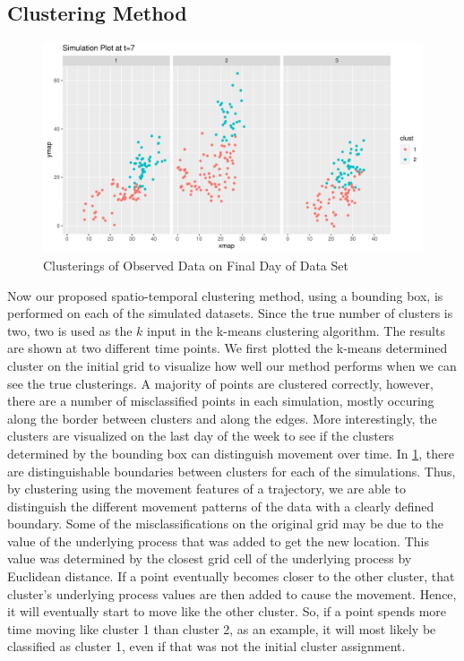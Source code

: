 \documentclass[12pt]{article}
\begin{document}
\hypertarget{clustering-method}{%
\subsection{Clustering Method}\label{clustering-method}}

\begin{figure}[tbp]

{\centering \includegraphics[width=\linewidth,]{spatio-temporal-model-arctic-sea-ice_files/figure-latex/all-clus-1} 

}

\caption{Clusterings of Observed Data on Final Day of Data Set}\label{fig:all-clus}
\end{figure}

Now our proposed spatio-temporal clustering method, using a bounding
box, is performed on each of the simulated datasets. Since the true
number of clusters is two, two is used as the \(k\) input in the k-means
clustering algorithm. The results are shown at two different time
points. We first plotted the k-means determined cluster on the initial
grid to visualize how well our method performs when we can see the true
clusterings. A majority of points are clustered correctly, however,
there are a number of misclassified points in each simulation, mostly
occuring along the border between clusters and along the edges. More
interestingly, the clusters are visualized on the last day of the week
to see if the clusters determined by the bounding box can distinguish
movement over time. In \cref{fig:all-clus}, there are distinguishable
boundaries between clusters for each of the simulations. Thus, by
clustering using the movement features of a trajectory, we are able to
distinguish the different movement patterns of the data with a clearly
defined boundary. Some of the misclassifications on the original grid
may be due to the value of the underlying process that was added to get
the new location. This value was determined by the closest grid cell of
the underlying process by Euclidean distance. If a point eventually
becomes closer to the other cluster, that cluster's underlying process
values are then added to cause the movement. Hence, it will eventually
start to move like the other cluster. So, if a point spends more time
moving like cluster 1 than cluster 2, as an example, it will most likely
be classified as cluster 1, even if that was not the initial cluster
assignment.
\end{document}
